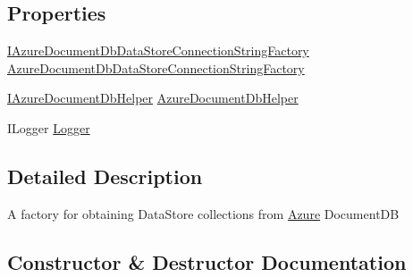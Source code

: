 \subsection*{Properties}
\begin{DoxyCompactItemize}
\item 
\hyperlink{interfaceCqrs_1_1Azure_1_1DocumentDb_1_1Factories_1_1IAzureDocumentDbDataStoreConnectionStringFactory}{I\+Azure\+Document\+Db\+Data\+Store\+Connection\+String\+Factory} \hyperlink{classCqrs_1_1Azure_1_1DocumentDb_1_1Factories_1_1AzureDocumentDbDataStoreFactory_ae5d98dfa935092643fe451ca64cd84e7_ae5d98dfa935092643fe451ca64cd84e7}{Azure\+Document\+Db\+Data\+Store\+Connection\+String\+Factory}
\item 
\hyperlink{interfaceCqrs_1_1Azure_1_1DocumentDb_1_1IAzureDocumentDbHelper}{I\+Azure\+Document\+Db\+Helper} \hyperlink{classCqrs_1_1Azure_1_1DocumentDb_1_1Factories_1_1AzureDocumentDbDataStoreFactory_a0fd0cb66b802fd374dbf8f89e7cdfbdc_a0fd0cb66b802fd374dbf8f89e7cdfbdc}{Azure\+Document\+Db\+Helper}
\item 
I\+Logger \hyperlink{classCqrs_1_1Azure_1_1DocumentDb_1_1Factories_1_1AzureDocumentDbDataStoreFactory_af0e1e5053d7d5d076de970c579b1f1bb_af0e1e5053d7d5d076de970c579b1f1bb}{Logger}
\end{DoxyCompactItemize}


\subsection{Detailed Description}
A factory for obtaining Data\+Store collections from \hyperlink{namespaceCqrs_1_1Azure}{Azure} Document\+DB 



\subsection{Constructor \& Destructor Documentation}
\mbox{\label{classCqrs_1_1Azure_1_1DocumentDb_1_1Factories_1_1AzureDocumentDbDataStoreFactory_a7bafe0acfcbb5eaacb5cd2714c39fa08_a7bafe0acfcbb5eaacb5cd2714c39fa08}} 

